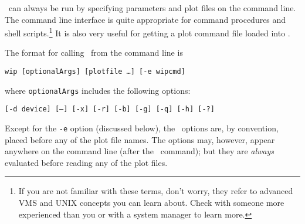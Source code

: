 %
%

\wip\ can always be run by specifying
parameters and plot files on the command line.
The command line interface is quite appropriate for
command procedures and shell scripts.\footnote{If you are not
familiar with these terms, don't worry,
they refer to advanced VMS and UNIX concepts you can learn about.
Check with someone more experienced than you or
with a system manager to learn more.}
It is also very useful for getting a plot command file loaded into \wip.

The format for calling \wip\ from the command line is
\begin{wiplist}%
  \item [\% ] {\tt wip  [optionalArgs] [plotfile \ldots ] [-e wipcmd]}
\end{wiplist}
where {\tt optionalArgs} includes the following options:
\begin{wiplist}%
  \item [\ ] {\tt [-d device] [--] [-x] [-r] [-b] [-g] [-q] [-h] [-?]}
\end{wiplist}
Except for the {\tt -e} option (discussed below),
the \wip\ options are, by convention,
placed before any of the plot file names.
The options may, however,
appear anywhere on the command line (after the \wip\ command);
but they are {\em always} evaluated before reading any of the plot files.

